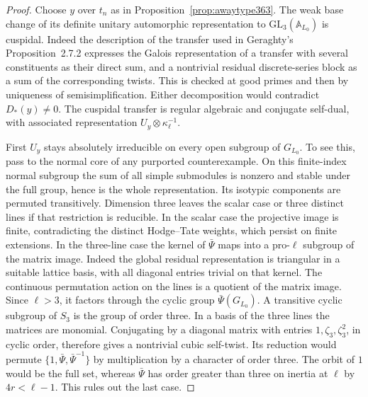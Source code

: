 \documentclass[a4paper,11pt]{article}
\theoremstyle{definition}
\theoremstyle{remark}
\numberwithin{equation}{section}
\begin{document}
\begin{proof}
Choose \(y\) over \(t_n\) as in Proposition~\ref{prop:awaytype363}.
The weak base change of its definite unitary automorphic
representation to \(\mathrm{GL}_3(\mathbb A_{L_0})\) is cuspidal.
Indeed the description of the transfer used in Geraghty's
Proposition~2.7.2 expresses the Galois representation of a
transfer with several constituents as their direct sum,
and a nontrivial residual discrete-series block as a sum
of the corresponding twists. This is checked at good primes
and then by uniqueness of semisimplification. Either
decomposition would contradict \(D_*(y)\ne0\).
The cuspidal transfer is regular algebraic and conjugate
self-dual, with associated representation \(U_y\otimes
\kappa_\ell^{-1}\).~\cite{VII-V-geraghty363}

First \(U_y\) stays absolutely irreducible on every open
subgroup of \(G_{L_0}\). To see this, pass to the normal core
of any purported counterexample. On this finite-index normal
subgroup the sum of all simple submodules is nonzero and
stable under the full group, hence is the whole representation.
Its isotypic components are permuted transitively. Dimension
three leaves the scalar case or three distinct lines if that
restriction is reducible. In the scalar case the projective
image is finite, contradicting the distinct Hodge--Tate
weights, which persist on finite extensions. In the three-line
case the kernel of \(\bar\Psi\) maps into a pro-\(\ell\) subgroup
of the matrix image. Indeed the global residual representation
is triangular in a suitable lattice basis, with all diagonal
entries trivial on that kernel. The continuous permutation
action on the lines is a quotient of the matrix image. Since
\(\ell>3\), it factors through the cyclic group
\(\bar\Psi(G_{L_0})\). A transitive cyclic subgroup of \(S_3\)
is the group of order three. In a basis of the three lines the
matrices are monomial. Conjugating by a diagonal matrix with
entries \(1,\zeta_3,\zeta_3^2\), in cyclic order, therefore gives
a nontrivial cubic self-twist. Its reduction would permute
\(\{1,\bar\Psi,\bar\Psi^{-1}\}\) by multiplication by a character
of order three. The orbit of \(1\) would be the full set, whereas
\(\bar\Psi\) has order greater than three on inertia at \(\ell\)
by \(4r<\ell-1\). This rules out the last case.


\end{proof}
\end{document}
